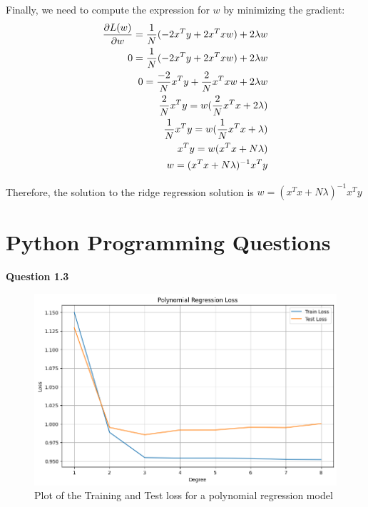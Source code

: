 \documentclass[12pt]{article}
\begin{document}
\begin{enumerate}
\begin{enumerate}
    Finally, we need to compute the expression for $w$ by minimizing the gradient: 
    \begin{align}
      \frac{\partial L(w)}{\partial w} = \frac{1}{N} (-2x^Ty + 2x^Txw) + 2 \lambda w \notag \\ 
      0 = \frac{1}{N} (-2x^Ty + 2x^Txw) + 2 \lambda w \notag \\ 
      0 = \frac{-2}{N} x^Ty + \frac{2}{N} x^Txw + 2 \lambda w \notag \\ 
      \frac{2}{N}x^Ty = w(\frac{2}{N}x^Tx + 2 \lambda) \notag \\ 
      \frac{1}{N}x^Ty = w(\frac{1}{N}x^Tx + \lambda) \notag \\ 
      x^Ty = w(x^Tx + N \lambda) \notag \\ 
      w = (x^Tx + N \lambda)^{-1} x^Ty \notag
    \end{align}

    Therefore, the solution to the ridge regression solution is $w = (x^Tx + N \lambda)^{-1} x^Ty$

  \end{enumerate}
  
\end{enumerate}

\section{Python Programming Questions}


\textbf{Question 1.3} \\ 

\begin{figure}[H]
  \centering
  \includegraphics[width=\textwidth]{1_3.png}
  \caption{Plot of the Training and Test loss for a polynomial regression model}
\end{figure} 
\end{document}
